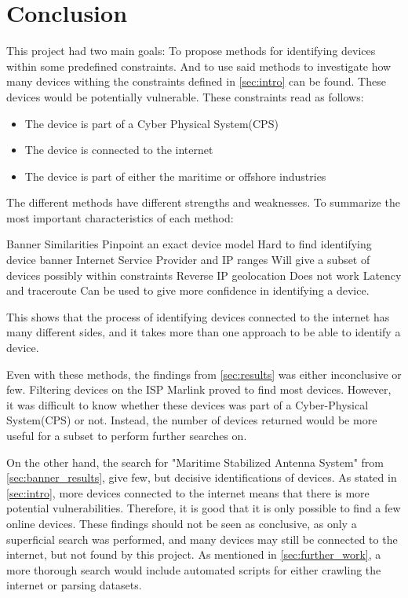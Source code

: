 \section{Conclusion} \label{sec:conclusion}
This project had two main goals: To propose methods for identifying devices within some predefined constraints. And to use said methods to investigate how many devices withing the constraints defined in \cref{sec:intro} can be found. These devices would be potentially vulnerable. 
These constraints read as follows:
\begin{itemize}
    \item The device is part of a Cyber Physical System(CPS)
    \item The device is connected to the internet
    \item The device is part of either the maritime or offshore industries
\end{itemize}

The different methods have different strengths and weaknesses. To summarize the most important characteristics of each method:

\begin{outline}[itemize]
    \setlength\itemsep{10em}
        \1 Banner Similarities
        \2 Pinpoint an exact device model
        \2 Hard to find identifying device banner
        \1 Internet Service Provider and IP ranges
        \2 Will give a subset of devices possibly within constraints
        \1 Reverse IP geolocation
        \2 Does not work
        \1 Latency and traceroute
        \2 Can be used to give more confidence in identifying a device.
\end{outline}

This shows that the process of identifying devices connected to the internet has many different sides, and it takes more than one approach to be able to identify a device.

Even with these methods, the findings from \cref{sec:results} was either inconclusive or few. Filtering devices on the ISP Marlink proved to find most devices. However, it was difficult to know whether these devices was part of a Cyber-Physical System(CPS) or not. Instead, the number of devices returned would be more useful for a subset to perform further searches on. 

On the other hand, the search for "Maritime Stabilized Antenna System" from \cref{sec:banner_results}, give few, but decisive identifications of devices. As stated in \cref{sec:intro}, more devices connected to the internet means that there is more potential vulnerabilities. Therefore, it is good that it is only possible to find a few online devices. These findings should not be seen as conclusive, as only a superficial search was performed, and many devices may still be connected to the internet, but not found by this project. As mentioned in \cref{sec:further_work}, a more thorough search would include automated scripts for either crawling the internet or parsing datasets. 


